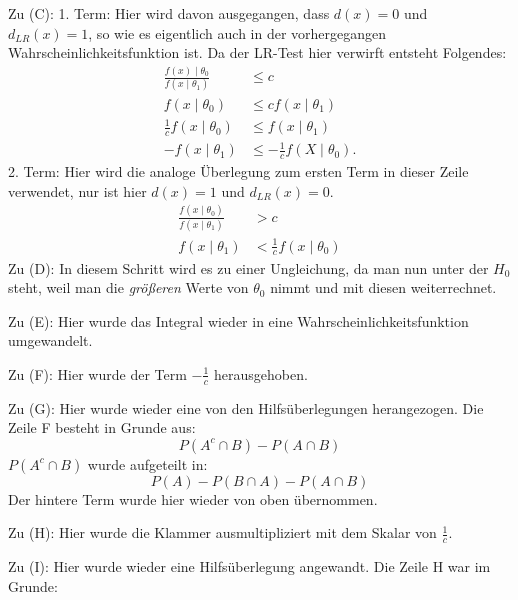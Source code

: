 \documentclass[10pt]{article}
\newcommand{\dlr}{d_{LR}}%
\newenvironment{BWS}[1][]
{\begin{Beweis}[frametitle=#1]}{\end{Beweis}}
\begin{document}
\begin{BWS}[Beweis 2.1.1 (NP-Lemma)]
			Zu (C): 1. Term: Hier wird davon ausgegangen, dass $d(x) =0$ und $\dlr(x) = 1$, so wie es eigentlich auch in der vorhergegangen Wahrscheinlichkeitsfunktion ist. Da der LR-Test hier verwirft entsteht Folgendes:
			\begin{equation*}
				\begin{split}
					\frac{f(x) \mid \theta_0}{f(x\mid \theta_1)} &\leq c \\
					f(x\mid \theta_0) &\leq c f(x\mid \theta_1)\\
					\frac{1}{c} f(x\mid \theta_0) &\leq f(x\mid \theta_1)\\
					-f(x\mid \theta_1) &\leq -\frac{1}{c} f(X\mid \theta_0).
				\end{split}
			\end{equation*}
			2. Term: Hier wird die analoge Überlegung zum ersten Term in dieser Zeile verwendet, nur ist hier $d(x) = 1$ und $\dlr(x)=0$. 
			\begin{equation*}
				\begin{split}
					\frac{f(x \mid \theta_0)}{f(x\mid \theta_1)} &> c \\
					f(x\mid \theta_1) &< \frac{1}{c} f(x \mid \theta_0)
				\end{split}
			\end{equation*}
			Zu (D): In diesem Schritt wird es zu einer Ungleichung, da man nun unter der $H_0$ steht, weil man die \textit{größeren} Werte von $\theta_0$ nimmt und mit diesen weiterrechnet.
			
			Zu (E): Hier wurde das Integral wieder in eine Wahrscheinlichkeitsfunktion umgewandelt.
			
			Zu (F): Hier wurde der Term $-\frac{1}{c}$ herausgehoben.
			
			Zu (G): Hier wurde wieder eine von den Hilfsüberlegungen herangezogen. Die Zeile F besteht in Grunde aus: 
			\begin{equation*}
				P(A^c \cap B) - P(A \cap B)
			\end{equation*}
			$P(A^c \cap B)$ wurde aufgeteilt in:
			\begin{equation*}
				P(A) - P(B \cap A) - P(A \cap B)
			\end{equation*}
			Der hintere Term wurde hier wieder von oben übernommen.
			
			Zu (H): Hier wurde die Klammer ausmultipliziert mit dem Skalar von $\frac{1}{c}$. 
			
			Zu (I): Hier wurde wieder eine Hilfsüberlegung angewandt. Die Zeile H war im Grunde:
			

\end{BWS}
\end{document}
